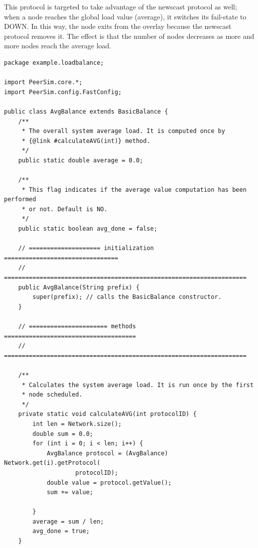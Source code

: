 \documentclass[a4paper,11pt]{article}
\begin{document}
This protocol is targeted to take advantage of the newscast protocol
as well; when a node reaches the global load value (average), it
switches its fail-state to DOWN. In this way, the node exits from the overlay
because the newscast protocol removes it. The effect is that
the number of nodes decreases as more and more nodes reach the average load.

\footnotesize
\begin{verbatim}
package example.loadbalance;

import PeerSim.core.*;
import PeerSim.config.FastConfig;

public class AvgBalance extends BasicBalance {
    /**
     * The overall system average load. It is computed once by
     * {@link #calculateAVG(int)} method.
     */
    public static double average = 0.0;

    /**
     * This flag indicates if the average value computation has been performed
     * or not. Default is NO.
     */
    public static boolean avg_done = false;

    // ==================== initialization ================================
    // ====================================================================
    public AvgBalance(String prefix) {
        super(prefix); // calls the BasicBalance constructor.
    }

    // ====================== methods =====================================
    // ====================================================================

    /**
     * Calculates the system average load. It is run once by the first
     * node scheduled. 
     */
    private static void calculateAVG(int protocolID) {
        int len = Network.size();
        double sum = 0.0;
        for (int i = 0; i < len; i++) {
            AvgBalance protocol = (AvgBalance) Network.get(i).getProtocol(
                    protocolID);
            double value = protocol.getValue();
            sum += value;

        }
        average = sum / len;
        avg_done = true;
    }
\end{verbatim}
\normalsize
\end{document}
